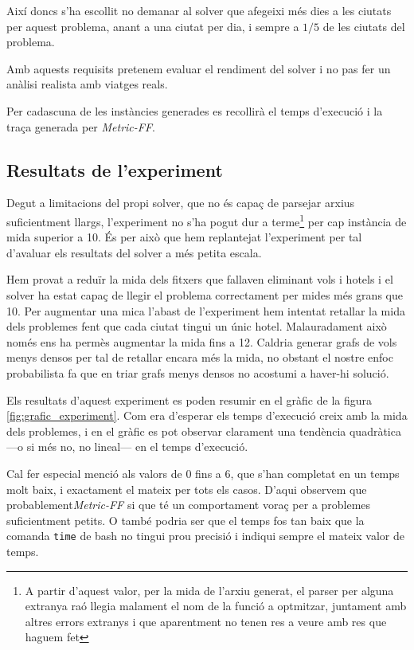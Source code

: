 \documentclass[11pt,a4paper]{article}
\begin{document}
Així doncs s'ha escollit no demanar al solver que afegeixi més dies a les ciutats per aquest problema, anant a una ciutat per dia, i sempre a $1/5$ de les ciutats del problema. 

Amb aquests requisits pretenem evaluar el rendiment del solver i no pas fer un anàlisi realista amb viatges reals.


Per cadascuna de les instàncies generades es recollirà el temps d'execució i la traça generada per \emph{Metric-FF}.


\subsection{Resultats de l'experiment}

Degut a limitacions del propi solver, que no és capaç de parsejar arxius suficientment llargs, l'experiment no s'ha pogut dur a terme\footnote{A partir d'aquest valor, per la mida de l'arxiu generat, el parser per alguna extranya raó llegia malament el nom de la funció a optmitzar, juntament amb altres errors extranys i que aparentment no tenen res a veure amb res que haguem fet} per cap instància de mida superior a 10. És per això que hem replantejat l'experiment per tal d'avaluar els resultats del solver a més petita escala. 

Hem provat a reduïr la mida dels fitxers que fallaven eliminant vols i hotels i el solver ha estat capaç de llegir el problema correctament per mides més grans que 10. Per augmentar una mica l'abast de l'experiment hem intentat retallar la mida dels problemes fent que cada ciutat tingui un únic hotel. Malauradament això només ens ha permès augmentar la mida fins a 12. Caldria generar grafs de vols menys densos per tal de retallar encara més la mida, no obstant el nostre enfoc probabilista fa que en triar grafs menys densos no acostumi a haver-hi solució.

Els resultats d'aquest experiment es poden resumir en el gràfic de la figura \ref{fig:grafic_experiment}. Com era d'esperar els temps d'execució creix amb la mida dels problemes, i en el gràfic es pot observar clarament una tendència quadràtica ---o si més no, no lineal--- en el temps d'execució.  

Cal fer especial menció als valors de 0 fins a 6, que s'han completat en un temps molt baix, i exactament el mateix per tots els casos. D'aqui observem que probablement\emph{Metric-FF} si que té un comportament voraç per a problemes suficientment petits. O també podria ser que el temps fos tan baix que la comanda \texttt{time} de bash no tingui prou precisió i indiqui sempre el mateix valor de temps.
\end{document}
